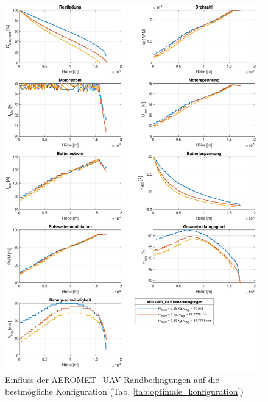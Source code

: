 \begin{figure}[H]
\centering
	\includegraphics[scale=0.7]{Diagramme/aeromet_randbedingungen.pdf}
	\caption{Einfluss der AEROMET\_UAV-Randbedingungen auf die bestmögliche Konfiguration (Tab. \ref{tab:optimale_konfiguration})}
	\label{abb:aeromet_rb}
\end{figure}

